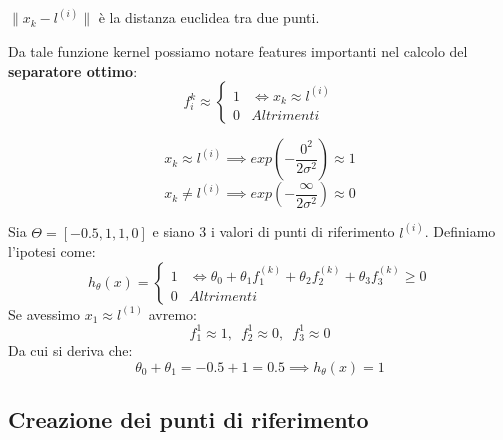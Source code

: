 \begin{nota}
$\lVert x_k - l^{(i)} \lVert$ è la distanza euclidea tra due punti.
\end{nota}
Da tale funzione kernel possiamo notare features importanti nel calcolo del \textbf{separatore ottimo}:
  \[f^k_i \approx
    \begin{cases}
      1& \iff x_k \approx l^{(i)} \\
      0& Altrimenti
    \end{cases}
  \]
  \begin{nota}
  \[x_k \approx l^{(i)} \implies  exp\left(-\frac{0^2}{2\sigma^2}\right)  \approx 1\]
  \[x_k \neq l^{(i)} \implies  exp\left(-\frac{\infty}{2\sigma^2}\right)  \approx 0\]
  \end{nota}
\begin{esempio}
  Sia $\Theta = [-0.5, 1, 1, 0]$ e siano 3 i valori di punti di riferimento $l^{(i)}$. Definiamo l'ipotesi come:
  \[h_\theta(x) =
    \begin{cases}
      1& \iff \theta_0 + \theta_1f_1^{(k)} + \theta_2f_2^{(k)} + 
      \theta_3f_3^{(k)} \geq 0 \\
      0& Altrimenti
    \end{cases}
  \]
  Se avessimo $x_1 \approx l^{(1)}$ avremo:
  \[f^1_1 \approx 1,\,\,\,f^1_2 \approx 0,\,\,\,f^1_3 \approx 0\]
  Da cui si deriva che:
  \[\theta_0 + \theta_1 = -0.5+1 = 0.5 \implies h_\theta(x) = 1\]
\end{esempio}
\subsection{Creazione dei punti di riferimento}
 
